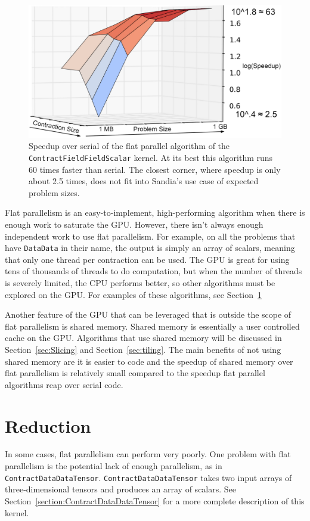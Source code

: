 \begin{figure}[!ht]
\includegraphics[scale=.8]{CFFSIndependent2.PNG}
\caption[Performance of \texttt{ContractFieldFieldScalar} flat parallel]
{Speedup over serial of the flat parallel algorithm of the
\texttt{ContractFieldFieldScalar} kernel. At its best this algorithm runs 60
times faster than serial. The closest corner, where speedup is only about 2.5
times, does not fit into Sandia's use case of expected problem sizes.
\label{lst:ContractFieldFieldScalar speedup over serial}} 
\end{figure}

Flat parallelism is an easy-to-implement, high-performing algorithm when there
is enough work to saturate the GPU. However, there isn't always enough
independent work to use flat parallelism. For example, on all the problems that
have \texttt{DataData} in their name, the output is simply an array of scalars,
meaning that only one thread per contraction can be used. The GPU is great for
using tens of thousands of threads to do computation, but when the number of
threads is severely limited, the CPU performs better, so other algorithms must
be explored on the GPU.  For examples of these algorithms, see
Section~\ref{sec:reduction}

Another feature of the GPU that can be leveraged that is outside the scope of
flat parallelism is shared memory. Shared memory is essentially a user
controlled cache on the GPU. Algorithms that use shared memory will be discussed
in Section~\ref{sec:Slicing} and Section~\ref{sec:tiling}. The main benefits of not
using shared memory are it is easier to code and the speedup of shared memory
over flat parallelism is relatively small compared to the speedup flat parallel
algorithms reap over serial code. 

\section{Reduction} \label{sec:reduction}
In some cases, flat parallelism can perform very poorly.  One problem with flat
parallelism is the potential lack of enough parallelism, as in
\texttt{ContractDataDataTensor}.  \texttt{ContractDataDataTensor} takes two
input arrays of three-dimensional tensors and produces an array of scalars.  See
Section~\ref{section:ContractDataDataTensor} for a more complete description of
this kernel.

